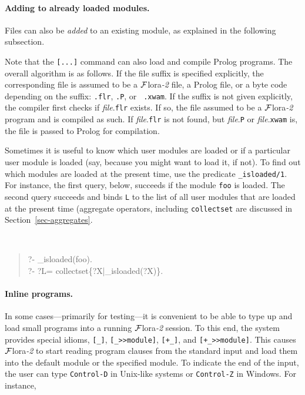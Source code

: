 \documentclass[11pt]{article}
\newcommand{\FLORA}{{\mbox{\sc ${\cal F}${lora}\rm\emph{-2}}}\xspace}
\newcommand{\ofile}{xwam}
\begin{document}
\paragraph{Adding to already loaded modules.}
Files can also be \emph{added} to an existing module, as explained in the
following subsection. 

Note that the {\tt [...]} command can also load and compile Prolog programs.
The overall algorithm is as follows. If the file suffix is specified
explicitly, the corresponding file is assumed to be a \FLORA file, a Prolog
file, or a byte code depending on the suffix: {\tt .flr}, {\tt .P}, or {\tt
  .\ofile}. If the suffix is not given explicitly, the compiler first checks if
{\it file}.{\tt flr} exists. If so, the file assumed to be a \FLORA program
and is compiled as such. If {\it file}.{\tt flr} is not found, but {\it
  file}.{\tt P} or {\it file}.{\tt xwam} is, the file is passed to Prolog for
compilation.


Sometimes it is useful to know which user modules are loaded or if a
particular user module is loaded (say, because you might want to load it,
if not).  To find out which modules are loaded at the present time, use the
predicate {\tt \_isloaded/1}. For instance, the first query,
below, succeeds if the module {\tt foo} is loaded. The second query
succeeds and binds {\tt L} to the list of all user modules that are loaded
at the present time (aggregate operators, including {\tt collectset} are
discussed in Section~\ref{sec-aggregates}.
{\tt
\begin{quote}
 ?- \_isloaded(foo).\\
 ?- ?L= collectset\{?X|\_isloaded(?X)\}.
\end{quote}
}

\paragraph{Inline programs.}
In some cases---primarily for testing---it is convenient to be able to type
up and load small programs into a running \FLORA session.
To this end, the system provides special idioms, \verb|[_]|,
\verb|[_>>module]|, \verb|[+_]|, and \verb|[+_>>module]|. This causes \FLORA to start reading program clauses
from the standard input and load them into the default module or the
specified module. To indicate the end of the input, the user can type
{\tt Control-D} in Unix-like systems or {\tt Control-Z} in Windows.  
For instance,
\end{document}
